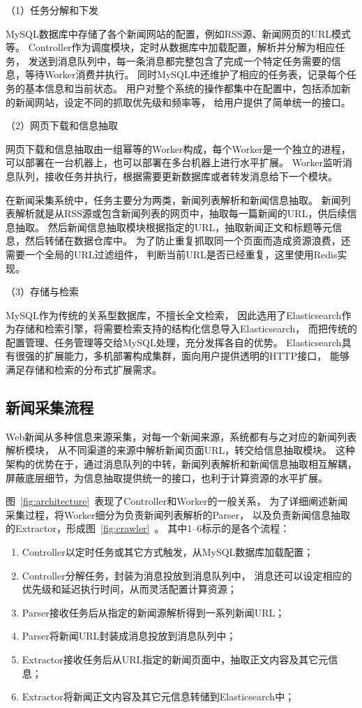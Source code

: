 （1）任务分解和下发

MySQL数据库中存储了各个新闻网站的配置，例如RSS源、新闻网页的URL模式等。
Controller作为调度模块，定时从数据库中加载配置，解析并分解为相应任务，
发送到消息队列中，每一条消息都完整包含了完成一个特定任务需要的信息，等待Worker消费并执行。
同时MySQL中还维护了相应的任务表，记录每个任务的基本信息和当前状态。
用户对整个系统的操作都集中在配置中，包括添加新的新闻网站，设定不同的抓取优先级和频率等，
给用户提供了简单统一的接口。

（2）网页下载和信息抽取

网页下载和信息抽取由一组幂等的Worker构成，每个Worker是一个独立的进程，
可以部署在一台机器上，也可以部署在多台机器上进行水平扩展。
Worker监听消息队列，接收任务并执行，根据需要更新数据库或者转发消息给下一个模块。

在新闻采集系统中，任务主要分为两类，新闻列表解析和新闻信息抽取。
新闻列表解析就是从RSS源或包含新闻列表的网页中，抽取每一篇新闻的URL，供后续信息抽取。
然后新闻信息抽取模块根据指定的URL，抽取新闻正文和标题等元信息，然后转储在数据仓库中。
为了防止重复抓取同一个页面而造成资源浪费，还需要一个全局的URL过滤组件，
判断当前URL是否已经重复，这里使用Redis实现。

（3）存储与检索

MySQL作为传统的关系型数据库，不擅长全文检索，
因此选用了Elasticsearch作为存储和检索引擎，将需要检索支持的结构化信息导入Elasticsearch，
而把传统的配置管理、任务管理等交给MySQL处理，充分发挥各自的优势。
Elasticsearch具有很强的扩展能力，多机部署构成集群，面向用户提供透明的HTTP接口，
能够满足存储和检索的分布式扩展需求。

\subsection{新闻采集流程}
Web新闻从多种信息来源采集，对每一个新闻来源，系统都有与之对应的新闻列表解析模块，
从不同渠道的来源中解析新闻页面URL，转交给信息抽取模块。
这种架构的优势在于，通过消息队列的中转，新闻列表解析和新闻信息抽取相互解耦，
屏蔽底层细节，为信息抽取提供统一的接口，也利于计算资源的水平扩展。

图~\ref{fig:architecture}~表现了Controller和Worker的一般关系，
为了详细阐述新闻采集过程，将Worker细分为负责新闻列表解析的Parser，
以及负责新闻信息抽取的Extractor，形成图~\ref{fig:crawler}~。
其中1--6标示的是各个流程：
\begin{enumerate}
\item Controller以定时任务或其它方式触发，从MySQL数据库加载配置；
\item Controller分解任务，封装为消息投放到消息队列中，
消息还可以设定相应的优先级和延迟执行时间，从而灵活配置计算资源；
\item Parser接收任务后从指定的新闻源解析得到一系列新闻URL；
\item Parser将新闻URL封装成消息投放到消息队列中；
\item Extractor接收任务后从URL指定的新闻页面中，抽取正文内容及其它元信息；
\item Extractor将新闻正文内容及其它元信息转储到Elasticsearch中；
\end{enumerate}

